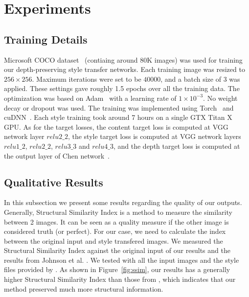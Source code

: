 \documentclass[10pt,twocolumn,letterpaper]{article}
\begin{document}
\section{Experiments}

\subsection{Training Details}

Microsoft COCO dataset~\cite{lin2014microsoft} (contiaing around 80K images) was used for training our depth-preserving style transfer networks. Each training image was resized to $256\times256$. Maximum iterations were set to be $40000$, and a batch size of 3 was applied. These settings gave roughly 1.5 epochs over all the training data. The optimization was based on Adam~\cite{kingma2014adam} with a learning rate of $1\times10^{-3}$. No weight decay or dropout was used. The training was implemented using Torch~\cite{collobert2011torch7} and cuDNN~\cite{chetlur2014cudnn}. Each style training took around 7 hours on a single GTX Titan X GPU. As for the target losses, the content target loss is computed at VGG network layer $relu2\_2$, the style target loss is computed at VGG network layers $relu1\_2$, $relu2\_2$, $relu3\_3$ and $relu4\_3$, and the depth target loss is computed at the output layer of Chen \etal network~\cite{chen2016single}.


\subsection{Qualitative Results}
In this subsection we present some results regarding the quality of our outputs. Generally, Structural Similarity Index is a method to measure the similarity between 2 images. It can be seen as a quality measure if the other image is considered truth (or perfect). For our case, we need to calculate the index between the original input and style transfered images. We measured the Structural Similarity Index against the original input of our results and the results from Johnson et al. \cite{johnson2016perceptual}. We tested with all the input images and the style files provided by \cite{johnson2016perceptual}.
As shown in Figure~\ref{fig:ssim}, our results has a generally higher Structural Similarity Index than those from \cite{johnson2016perceptual}, which indicates that our method preserved much more structural information.
\end{document}
